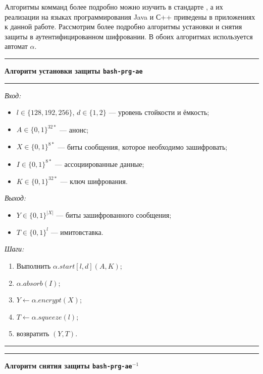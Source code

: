 	Алгоритмы комманд более подробно можно изучить в стандарте \cite{standard-77}, а их реализации
	на языках программирования Java и С++ приведены в приложениях к данной работе. Рассмотрим 
	более подробно алгоритмы установки и снятия защиты в аутентифицированном шифровании. В обоих
	алгоритмах используется автомат $\alpha$.
	
	\noindent\rule{\textwidth}{1pt}
	
	\textbf{Алгоритм установки защиты \texttt{bash-prg-ae}}

	\noindent\rule{\textwidth}{1pt}
	
	\textit{Вход:}
	
	\begin{itemize}
		\item $l \in \{128, 192, 256\}$, $d \in \{1, 2\}$ --- уровень стойкости и ёмкость;
		\item $A \in \{0, 1\}^{32*}$ --- анонс;
		\item $X \in \{0, 1\}^{8*}$ --- биты сообщения, которое необходимо зашифровать;
		\item $I \in \{0, 1\}^{8*}$ --- ассоциированные данные;
		\item $K \in \{0, 1\}^{32*}$ --- ключ шифрования.
	\end{itemize}
	
	\textit{Выход:}
	
	\begin{itemize}
		\item $Y \in \{0, 1\}^{|X|}$ --- биты зашифрованного сообщения;
		\item $T \in \{0, 1\}^l$ --- имитовставка.
	\end{itemize}
	
	\textit{Шаги:}
	
	\begin{enumerate}
		\item Выполнить $\alpha .start \left[l, d\right] \left(A, K\right)$;
		\item $\alpha .absorb \left(I\right)$;
		\item $Y \leftarrow \alpha .encrypt \left(X\right)$;
		\item $T \leftarrow \alpha .squeeze \left(l\right)$;
		\item возвратить $\left(Y, T\right)$.
	\end{enumerate}
	
	\noindent\rule{\textwidth}{1pt}
	
	\noindent\rule{\textwidth}{1pt}
	
	\textbf{Алгоритм снятия защиты \texttt{bash-prg-ae}$^{-1}$}
	
